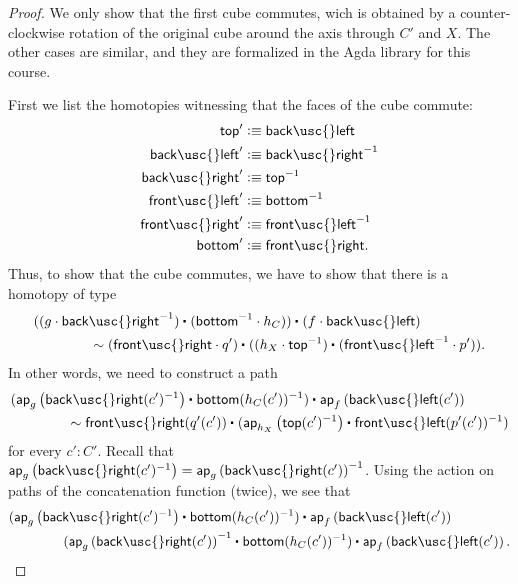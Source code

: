 \begin{proof}
  We only show that the first cube commutes, wich is obtained by a counter-clockwise rotation of the original cube around the axis through $C'$ and $X$. The other cases are similar, and they are formalized in the Agda library for this course.

  First we list the homotopies witnessing that the faces of the cube commute:
  \begin{align*}
    \mathsf{top}' & \defeq \mathsf{back\usc{}left} \\
    \mathsf{back\usc{}left}' & \defeq \mathsf{back\usc{}right}^{-1} \\
    \mathsf{back\usc{}right}' & \defeq \mathsf{top}^{-1} \\
    \mathsf{front\usc{}left}' & \defeq \mathsf{bottom}^{-1} \\
    \mathsf{front\usc{}right}' & \defeq \mathsf{front\usc{}left}^{-1} \\
    \mathsf{bottom}' & \defeq \mathsf{front\usc{}right}. 
  \end{align*}
  Thus, to show that the cube commutes, we have to show that there is a homotopy of type
  \begin{align*}
    & \ct{(\ct{(g \cdot \mathsf{back\usc{}right}^{-1})}{(\mathsf{bottom}^{-1}\cdot h_C)})}{(f \cdot \mathsf{back\usc{}left})} \\
    & \qquad\qquad \htpy \ct{(\mathsf{front\usc{}right}\cdot q')}{(\ct{(h_X \cdot \mathsf{top}^{-1})}{(\mathsf{front\usc{}left}^{-1}\cdot p')})}.
  \end{align*}
  In other words, we need to construct a path
  \begin{align*}
    & \ct{(\ct{\ap{g}{\mathsf{back\usc{}right}(c')^{-1}}}{\mathsf{bottom}(h_C(c'))^{-1}})}{\ap{f}{\mathsf{back\usc{}left}(c')}} \\
    & \qquad\qquad \htpy \ct{\mathsf{front\usc{}right}(q'(c'))}{(\ct{\ap{h_X}{\mathsf{top}(c')^{-1}}}{\mathsf{front\usc{}left}(p'(c'))^{-1}})}
  \end{align*}
  for every $c':C'$. Recall that $\ap{g}{\mathsf{back\usc{}right}(c')^{-1}}=\ap{g}{\mathsf{back\usc{}right}(c')}^{-1}$. Using the action on paths of the concatenation function (twice), we see that
  \begin{align*}
    & \ct{(\ct{\ap{g}{\mathsf{back\usc{}right}(c')^{-1}}}{\mathsf{bottom}(h_C(c'))^{-1}})}{\ap{f}{\mathsf{back\usc{}left}(c')}} \\
    & \qquad\qquad \ct{(\ct{\ap{g}{\mathsf{back\usc{}right}(c')}^{-1}}{\mathsf{bottom}(h_C(c'))^{-1}})}{\ap{f}{\mathsf{back\usc{}left}(c')}}.

\end{align*}
\end{proof}
